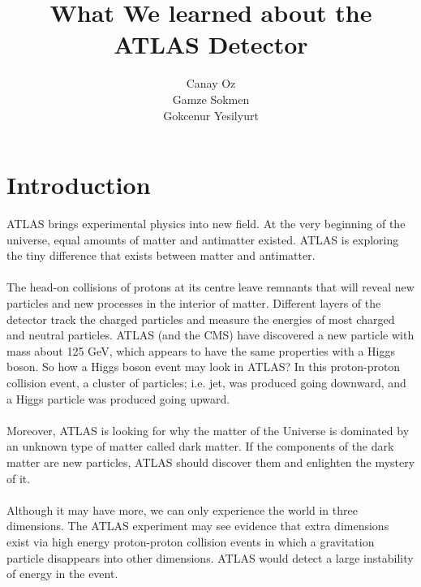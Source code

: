 \documentclass[a4paper,9pt]{article}
\title{ What We learned about the ATLAS Detector}
\author{Canay Oz \\ Gamze Sokmen \\ Gokcenur Yesilyurt}
\begin{document}
 
\maketitle
 
\section{Introduction}
ATLAS brings experimental physics into new field. At the very beginning of the universe, equal amounts of matter and antimatter existed.
ATLAS is exploring the tiny difference that exists between matter and antimatter. 
\\\\
The head-on collisions of protons at its centre leave remnants that will reveal new particles and new processes in the interior of matter.
Different layers of the detector track the charged particles and measure the energies of most charged and neutral particles. 
ATLAS (and the CMS) have discovered a new particle with mass about 125 GeV, which appears to have the same properties with a Higgs boson.
So how a Higgs boson event may look in ATLAS? In this proton-proton collision event, a cluster of particles; i.e. jet, was
produced going downward, and a Higgs particle was produced going upward. 
\\\\
Moreover, ATLAS is looking for why the matter of the Universe is dominated by an unknown type of matter called dark matter.
If the components of the dark matter are new particles, ATLAS should discover them and enlighten the mystery of it. 
\\\\
Although it may have more, we can only experience the world in three dimensions.
The ATLAS experiment may see evidence that extra dimensions exist via high energy proton-proton collision events in which a gravitation
particle disappears into other dimensions. ATLAS would detect a large instability of energy in the event. 
\end{document}
